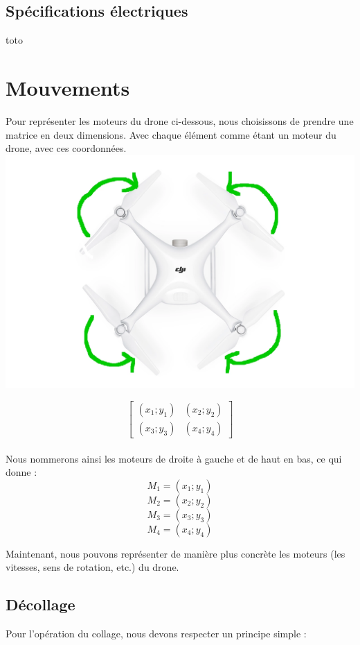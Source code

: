 \documentclass{rapport}
\begin{document}
\subsection{Spécifications électriques}
toto \\

\section{Mouvements}
Pour représenter les moteurs du drone ci-dessous, nous choisissons de prendre une matrice en deux dimensions. Avec chaque élément comme étant un moteur du drone, avec ces coordonnées. \\

{ \centering \includegraphics[scale=0.5]{src/1DJI.png} \\}

$$\begin{bmatrix}
(x_1; y_1) & (x_2; y_2) \\
(x_3; y_3) & (x_4; y_4)
\end{bmatrix}$$ \\

Nous nommerons ainsi les moteurs de droite à gauche et de haut en bas, ce qui donne :
$$M_1 = (x_1; y_1)$$
$$M_2 = (x_2; y_2)$$
$$M_3 = (x_3; y_3)$$
$$M_4 = (x_4; y_4)$$

Maintenant, nous pouvons représenter de manière plus concrète les moteurs (les vitesses, sens de rotation, etc.) du drone.

\subsection{Décollage}
Pour l'opération du collage, nous devons respecter un principe simple :
\end{document}
